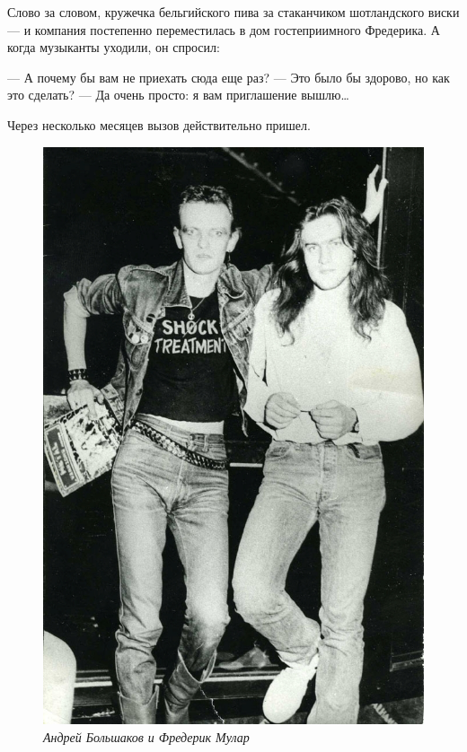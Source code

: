 \documentclass[16pt,a5paper,oneside]{book}
\begin{document}
Слово за словом, кружечка бельгийского пива за стаканчиком шотландского виски — и компания постепенно переместилась в
дом гостеприимного Фредерика. А когда музыканты уходили, он спросил:

— А почему бы вам не приехать сюда еще раз?
— Это было бы здорово, но как это сделать?
— Да очень просто: я вам приглашение вышлю\ldots

Через несколько месяцев вызов действительно пришел.

\begin{figure}
    \centering
    \includegraphics[scale=0.9]{Image23}
    \caption{\textit{Андрей Большаков и Фредерик Мулар}}
\end{figure}
\end{document}
